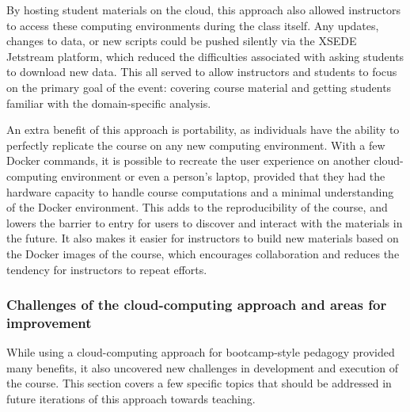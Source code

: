 By hosting student materials on the cloud, this approach also allowed instructors
to access these computing environments during the class itself. Any updates,
changes to data, or new scripts could be pushed silently via the XSEDE Jetstream
platform, which reduced the difficulties associated with asking students to
download new data. This all served to allow instructors and students to focus on
the primary goal of the event: covering course material and getting students
familiar with the domain-specific analysis.

An extra benefit of this approach is portability, as individuals have the
ability to perfectly replicate the course on any new computing environment. With
a few Docker commands, it is possible to recreate the user experience on another
cloud-computing environment or even a person's laptop, provided that they had
the hardware capacity to handle course computations and a minimal understanding
of the Docker environment. This adds to the reproducibility of the course, and
lowers the barrier to entry for users to discover and interact with the
materials in the future. It also makes it easier for instructors to build new
materials based on the Docker images of the course, which encourages
collaboration and reduces the tendency for instructors to repeat efforts.

\subsubsection{Challenges of the cloud-computing approach and areas for improvement}

While using a cloud-computing approach for bootcamp-style pedagogy provided many
benefits, it also uncovered new challenges in development and execution of the
course. This section covers a few specific topics that should be addressed in
future iterations of this approach towards teaching.

